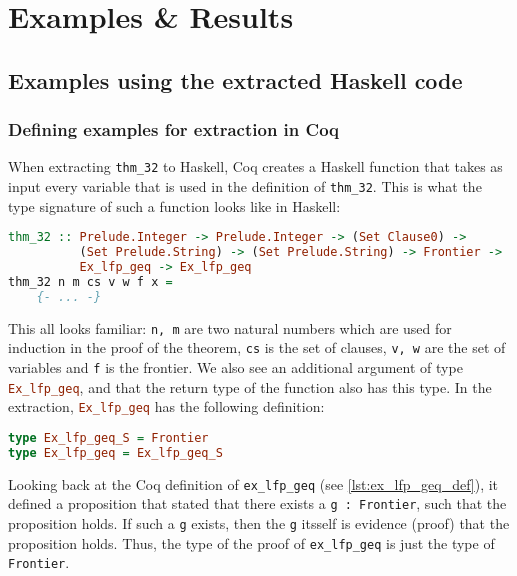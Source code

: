 \chapter{Examples \& Results}

\section{Examples using the extracted Haskell code}

\subsection{Defining examples for extraction in Coq}

When extracting \lstinline{thm_32} to Haskell, Coq
creates a Haskell function that takes as input every variable
that is used in the definition of \lstinline{thm_32}.
This is what the type signature of such a function looks like in Haskell:

\begin{minipage}{\linewidth}
\begin{lstlisting}[language=Haskell, label={lst:thm_32_type_sig_haskell}, caption={Type signature of Haskell extraction of \lstinline{thm_32}}]
thm_32 :: Prelude.Integer -> Prelude.Integer -> (Set Clause0) ->
          (Set Prelude.String) -> (Set Prelude.String) -> Frontier ->
          Ex_lfp_geq -> Ex_lfp_geq
thm_32 n m cs v w f x =
    {- ... -}
\end{lstlisting}
\end{minipage}

This all looks familiar: \lstinline{n, m} are two natural numbers which are used for induction in the proof of the theorem,
\lstinline{cs} is the set of clauses, \lstinline{v, w} are the set of variables
and \lstinline{f} is the frontier.
We also see an additional argument of type \lstinline[language=Haskell]{Ex_lfp_geq}, and that the return type
of the function also has this type.
In the extraction, \lstinline[language=Haskell]{Ex_lfp_geq} has the following definition:

\begin{minipage}{\linewidth}
\begin{lstlisting}[language=Haskell, label={lst:ex_lfp_geq_haskell}, caption={\lstinline{Ex_lfp_geq} in Haskell}]
type Ex_lfp_geq_S = Frontier
type Ex_lfp_geq = Ex_lfp_geq_S
\end{lstlisting}
\end{minipage}

Looking back at the Coq definition of \lstinline{ex_lfp_geq} (see \autoref{lst:ex_lfp_geq_def}),
it defined a proposition that stated that there
exists a \lstinline{g : Frontier}, such that the proposition holds.
If such a \lstinline{g} exists, then the \lstinline{g} itsself is evidence (proof) that the proposition holds.
Thus, the type of the proof of \lstinline{ex_lfp_geq} is just the type of \lstinline{Frontier}.

